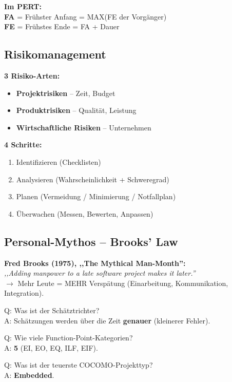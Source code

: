 \documentclass[11pt,a4paper]{article}
\begin{document}
\begin{merkhilfe}
\textbf{Im PERT:}\\
\textbf{FA} = Frühster Anfang = MAX(FE der Vorgänger)\\
\textbf{FE} = Frühstes Ende = FA + Dauer
\end{merkhilfe}

\subsection{Risikomanagement}

\begin{keyfacts}
\textbf{3 Risiko-Arten:}
\begin{itemize}
  \item \textbf{Projektrisiken} -- Zeit, Budget
  \item \textbf{Produktrisiken} -- Qualität, Leistung
  \item \textbf{Wirtschaftliche Risiken} -- Unternehmen
\end{itemize}

\textbf{4 Schritte:}
\begin{enumerate}
  \item Identifizieren (Checklisten)
  \item Analysieren (Wahrscheinlichkeit + Schweregrad)
  \item Planen (Vermeidung / Minimierung / Notfallplan)
  \item Überwachen (Messen, Bewerten, Anpassen)
\end{enumerate}
\end{keyfacts}

\subsection{Personal-Mythos -- Brooks' Law}

\begin{story}
\textbf{Fred Brooks (1975), ,,The Mythical Man-Month'':}\\
\emph{,,Adding manpower to a late software project makes it later.''}\\
$\rightarrow$ Mehr Leute = MEHR Verspätung (Einarbeitung, Kommunikation, Integration).
\end{story}

\begin{quickcheck}
Q: Was ist der Schätztrichter?\\
A: Schätzungen werden über die Zeit \textbf{genauer} (kleinerer Fehler).

Q: Wie viele Function-Point-Kategorien?\\
A: \textbf{5} (EI, EO, EQ, ILF, EIF).

Q: Was ist der teuerste COCOMO-Projekttyp?\\
A: \textbf{Embedded}.
\end{quickcheck}
\end{document}
